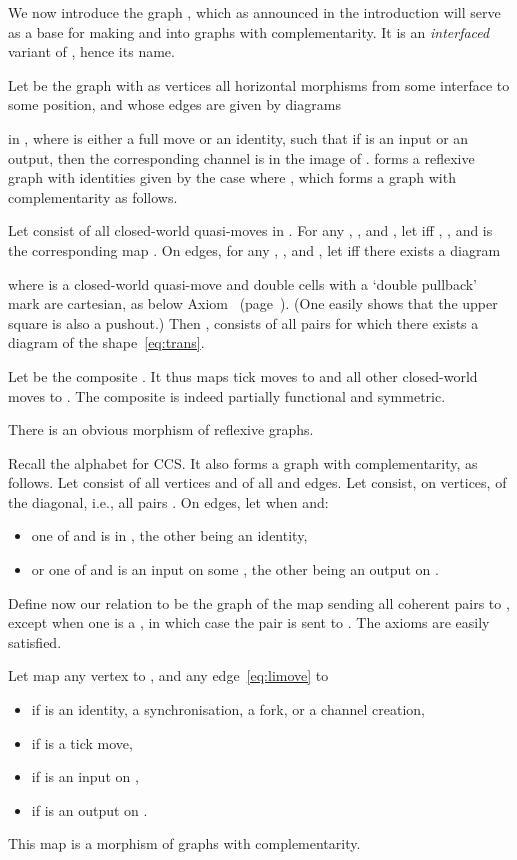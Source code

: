\documentclass{LMCS}
\theoremstyle{plain}\newtheorem{satz}[thm]{Satz}
\begin{document}
We now introduce the graph , which as announced in the
introduction will serve as a base for making  and
 into graphs with complementarity. It is an
\emph{interfaced} variant of , hence its name.
\begin{exa}
  Let  be the graph with as vertices all horizontal morphisms  from some interface to some position, and whose
  edges  are given by diagrams

in , where  is either a full move or an identity, such that if
 is an input or an output, then the corresponding channel is in the
image of .   forms a reflexive graph with identities given by
the case where , which forms a graph with complementarity as
follows.

Let  consist of all closed-world quasi-moves in . For any , , and , let
 iff , , and  is
the corresponding map . On edges, for any , , and , let  iff there exists a diagram
      
    where  is a closed-world quasi-move and double cells with a
    `double pullback' mark are cartesian, as below
    Axiom~ (page~\pageref{fibration}). (One
    easily shows that the upper square is also a pushout.)  Then
    , consists of all pairs  for which there
    exists a diagram of the shape~\eqref{eq:trans}.

    Let  be the composite . It thus maps tick moves to  and
    all other closed-world moves to . The composite  is indeed partially
    functional and symmetric.

    There is an obvious morphism  of reflexive graphs.
\end{exa}

\begin{exa}\label{exa:Axi}
  Recall the alphabet  for CCS. It also forms a graph with complementarity, as follows.
Let  consist of all vertices and of all  and  edges.
Let  consist, on vertices, of the diagonal, i.e., all pairs .
On edges, let  when  and:
\begin{itemize}
\item one of  and  is in , the other being an identity,
\item or one of  and  is an input on some ,
  the other being an output on .
\end{itemize}
Define now our relation  to be the graph of the map sending
all coherent pairs  to , except when one is a ,
in which case the pair is sent to . The axioms
are easily satisfied.

Let  map any vertex  to 
, and any edge~\eqref{eq:limove} to
\begin{itemize}
\item  if  is an identity, a synchronisation, a fork, or a channel creation,
\item  if  is a tick move,
\item  if  is an input on ,
\item  if  is an output on .
\end{itemize}
This map  is a morphism of graphs with complementarity.
\end{exa}
\end{document}
